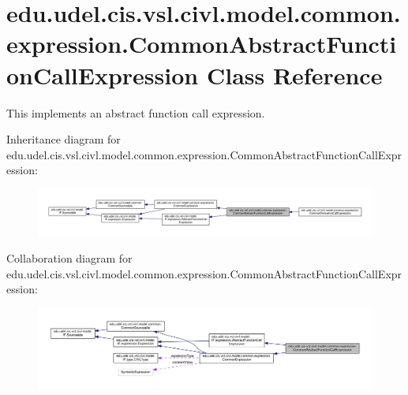 \hypertarget{classedu_1_1udel_1_1cis_1_1vsl_1_1civl_1_1model_1_1common_1_1expression_1_1CommonAbstractFunctionCallExpression}{}\section{edu.\+udel.\+cis.\+vsl.\+civl.\+model.\+common.\+expression.\+Common\+Abstract\+Function\+Call\+Expression Class Reference}
\label{classedu_1_1udel_1_1cis_1_1vsl_1_1civl_1_1model_1_1common_1_1expression_1_1CommonAbstractFunctionCallExpression}


This implements an abstract function call expression.  




Inheritance diagram for edu.\+udel.\+cis.\+vsl.\+civl.\+model.\+common.\+expression.\+Common\+Abstract\+Function\+Call\+Expression\+:
\nopagebreak
\begin{figure}[H]
\begin{center}
\leavevmode
\includegraphics[width=350pt]{classedu_1_1udel_1_1cis_1_1vsl_1_1civl_1_1model_1_1common_1_1expression_1_1CommonAbstractFunctionCallExpression__inherit__graph}
\end{center}
\end{figure}


Collaboration diagram for edu.\+udel.\+cis.\+vsl.\+civl.\+model.\+common.\+expression.\+Common\+Abstract\+Function\+Call\+Expression\+:
\nopagebreak
\begin{figure}[H]
\begin{center}
\leavevmode
\includegraphics[width=350pt]{classedu_1_1udel_1_1cis_1_1vsl_1_1civl_1_1model_1_1common_1_1expression_1_1CommonAbstractFunctionCallExpression__coll__graph}
\end{center}
\end{figure}
